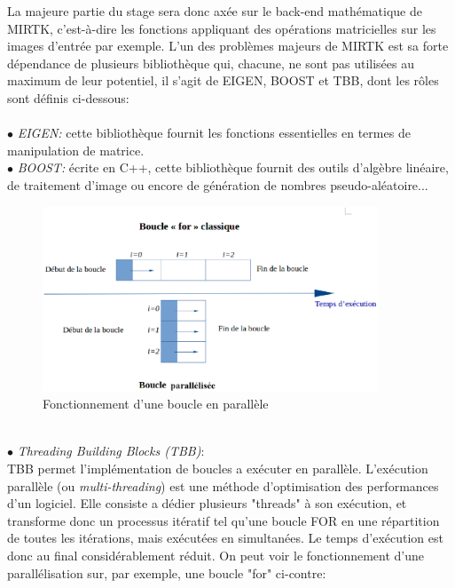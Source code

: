 \documentclass[10pt]{report}
\begin{document}
	La majeure partie du stage sera donc axée sur le back-end mathématique de MIRTK, c'est-à-dire les fonctions appliquant des opérations matricielles sur les images d'entrée par exemple. L'un des problèmes majeurs de MIRTK est sa forte dépendance de plusieurs bibliothèque qui, chacune, ne sont pas utilisées au maximum de leur potentiel, il s'agit de EIGEN, BOOST et TBB, dont les rôles sont définis ci-dessous:\\
		\\{$\bullet$} \textit{EIGEN:} cette bibliothèque fournit les fonctions essentielles en termes de manipulation de matrice. \newline
		\\{$\bullet$} \textit{BOOST:} écrite en C++, cette bibliothèque fournit des outils d'algèbre linéaire, de traitement d'image ou encore de génération de nombres pseudo-aléatoire... \newline
		\begin{figure}
			\includegraphics[width=10cm]{Reports/figures/gfor.eps}	
			\caption{Fonctionnement d'une boucle en parallèle}
			\label{Fonctionnement d'une boucle en parallèle}
		\end{figure}\\
		{$\bullet$} \textit{Threading Building Blocks (TBB)}: 
		\\

	TBB permet l'implémentation de boucles a exécuter en parallèle. L'exécution parallèle (ou \textit{multi-threading}) est une méthode d'optimisation des performances d'un logiciel. Elle consiste a dédier plusieurs "threads" à son exécution, et transforme donc un processus itératif tel qu'une boucle FOR en une répartition de toutes les itérations, mais exécutées en simultanées. Le temps d'exécution est donc au final considérablement réduit. On peut voir le fonctionnement d'une parallélisation sur, par exemple, une boucle "for" ci-contre:\vspace{1,5cm}\\
	
\end{document}
